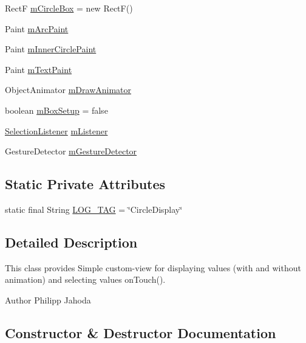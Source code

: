 \begin{DoxyCompactItemize}
Rect\+F \hyperlink{classcs_1_1usense_1_1_circle_display_ae25a9c68b75ab460d8fc52214a9cb7fd}{m\+Circle\+Box} = new Rect\+F()
\item 
Paint \hyperlink{classcs_1_1usense_1_1_circle_display_a052f51c1e072e1e3c6d5e9ca7347f11a}{m\+Arc\+Paint}
\item 
Paint \hyperlink{classcs_1_1usense_1_1_circle_display_a40cb3444d9793dd9e98e8bfe6e178764}{m\+Inner\+Circle\+Paint}
\item 
Paint \hyperlink{classcs_1_1usense_1_1_circle_display_a222a7017e376f115236b12808129846e}{m\+Text\+Paint}
\item 
Object\+Animator \hyperlink{classcs_1_1usense_1_1_circle_display_a40384ff97e0c9f940d669910cc5427d8}{m\+Draw\+Animator}
\item 
boolean \hyperlink{classcs_1_1usense_1_1_circle_display_a6ff55c9c52c8d854e728100a47f576ef}{m\+Box\+Setup} = false
\item 
\hyperlink{interfacecs_1_1usense_1_1_circle_display_1_1_selection_listener}{Selection\+Listener} \hyperlink{classcs_1_1usense_1_1_circle_display_a08e7235a7ef3aa1f5e4e9e1c7458343c}{m\+Listener}
\item 
Gesture\+Detector \hyperlink{classcs_1_1usense_1_1_circle_display_ab12257b390772bc6513cf1ee49b9b729}{m\+Gesture\+Detector}
\end{DoxyCompactItemize}
\subsection*{Static Private Attributes}
\begin{DoxyCompactItemize}
\item 
static final String \hyperlink{classcs_1_1usense_1_1_circle_display_a7ed7b9fe57335bc6748560bd46cd40a9}{L\+O\+G\+\_\+\+T\+A\+G} = \char`\"{}Circle\+Display\char`\"{}
\end{DoxyCompactItemize}


\subsection{Detailed Description}
This class provides Simple custom-\/view for displaying values (with and without animation) and selecting values on\+Touch().

\begin{DoxyAuthor}{Author}
Philipp Jahoda 
\end{DoxyAuthor}


\subsection{Constructor \& Destructor Documentation}
\hypertarget{classcs_1_1usense_1_1_circle_display_a1eb75f9b9885a4e1e12e433b15711e2d}{}

